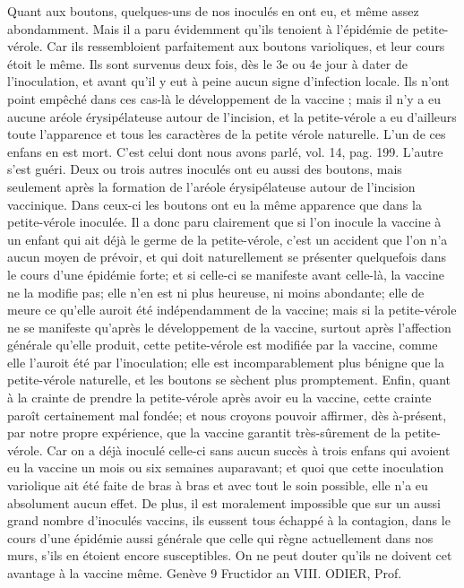 Quant aux boutons, quelques-uns de nos inoculés en ont eu, et même assez abondamment. Mais il a paru évidemment qu’ils tenoient à l’épidémie de petite-vérole. Car ils ressembloient parfaitement aux boutons varioliques, et leur cours étoit le même. Ils sont survenus deux fois, dès le 3e ou 4e jour à dater de l’inoculation, et avant qu’il y eut à peine aucun signe d’infection locale. Ils n’ont point empêché dans ces cas-là le développement de la vaccine ; mais il n’y a eu aucune aréole érysipélateuse autour de l’incision, et la petite-vérole a eu d’ailleurs toute l’apparence et tous les caractères de la petite vérole naturelle. L’un de ces enfans en est mort. C’est celui dont nous avons parlé, vol. 14, pag. 199. L’autre s’est guéri. Deux ou trois autres inoculés ont eu aussi des boutons, mais seulement après la formation de l’aréole érysipélateuse autour de l’incision vaccinique. Dans ceux-ci les boutons ont eu la même apparence que dans la petite-vérole inoculée. Il a donc paru clairement que si l’on inocule la vaccine à un enfant qui ait déjà le germe de la petite-vérole, c’est un accident que l’on n’a aucun moyen de prévoir, et qui doit naturellement se présenter quelquefois dans le cours d’une épidémie forte; et si celle-ci se manifeste avant celle-là, la\setcounter{page}{397} vaccine ne la modifie pas; elle n'en est ni plus heureuse, ni moins abondante; elle de meure ce qu'elle auroit été indépendamment de la vaccine; mais si la petite-vérole ne se manifeste qu'après le développement de la vaccine, surtout après l'affection générale qu'elle produit, cette petite-vérole est modifiée par la vaccine, comme elle l'auroit été par l'inoculation; elle est incomparablement plus bénigne que la petite-vérole naturelle, et les boutons se sèchent plus promptement.
Enfin, quant à la crainte de prendre la petite-vérole après avoir eu la vaccine, cette crainte paroît certainement mal fondée; et nous croyons pouvoir affirmer, dès à-présent, par notre propre expérience, que la vaccine garantit très-sûrement de la petite-vérole. Car on a déjà inoculé celle-ci sans aucun succès à trois enfans qui avoient eu la vaccine un mois ou six semaines auparavant; et quoi que cette inoculation variolique ait été faite de bras à bras et avec tout le soin possible, elle n'a eu absolument aucun effet. De plus, il est moralement impossible que sur un aussi grand nombre d'inoculés vaccins, ils eussent tous échappé à la contagion, dans le cours d'une épidémie aussi générale que celle qui règne actuellement dans nos murs, s'ils en\setcounter{page}{398} étoient encore susceptibles. On ne peut douter qu'ils ne doivent cet avantage à la vaccine même.
Genève 9 Fructidor an VIII.
ODIER, Prof.
